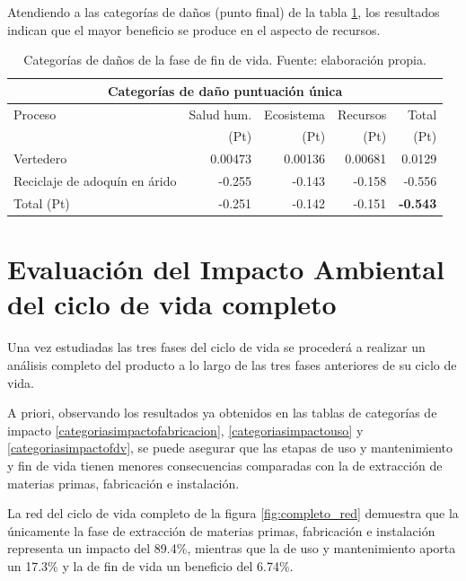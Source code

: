 Atendiendo a las categorías de daños (punto final) de la tabla \ref{categoriasdanosfdv}, los resultados indican que el mayor beneficio se produce en el aspecto de recursos.

\begin{table}[!htb]
\centering
\begin{tabular}{p{6cm}rrrr}
\toprule
\multicolumn{5}{c}{Categorías de daño puntuación única}\\
\midrule
Proceso & Salud hum. & Ecosistema & Recursos & Total\\
 & (Pt) & (Pt) & (Pt) & (Pt)\\
\midrule
Vertedero & 0.00473 & 0.00136 & 0.00681 & 0.0129\\
Reciclaje de adoquín en árido & -0.255 & -0.143 & -0.158 & -0.556\\
\midrule
Total (Pt) & -0.251 & -0.142 & -0.151 & \textbf{-0.543}\\
\bottomrule
\end{tabular}
\caption[Categorías de daños de la fase de fin de vida.]{Categorías de daños de la fase de fin de vida. Fuente: elaboración propia.}
\label{categoriasdanosfdv}
\end{table}

\section{Evaluación del Impacto Ambiental del ciclo de vida completo}

Una vez estudiadas las tres fases del ciclo de vida se procederá a realizar un análisis completo del producto a lo largo de las tres fases anteriores de su ciclo de vida.

A priori, observando los resultados ya obtenidos en las tablas de categorías de impacto \ref{categoriasimpactofabricacion}, \ref{categoriasimpactouso} y \ref{categoriasimpactofdv}, se puede asegurar que las etapas de uso y mantenimiento y fin de vida tienen menores consecuencias comparadas con la de extracción de materias primas, fabricación e instalación.

La red del ciclo de vida completo de la figura \ref{fig:completo_red} demuestra que la únicamente la fase de extracción de materias primas, fabricación e instalación representa un impacto del 89.4\%, mientras que la de uso y mantenimiento aporta un 17.3\% y la de fin de vida un beneficio del 6.74\%.

